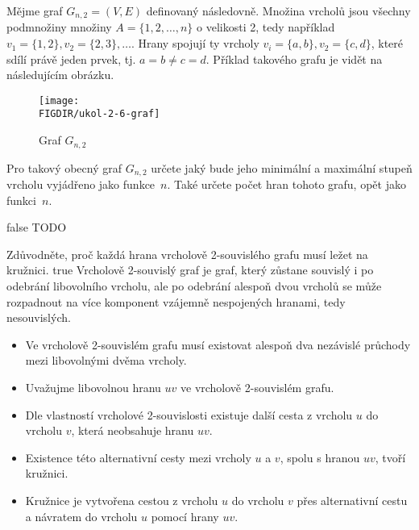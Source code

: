 \documentclass[10pt, a4paper]{ReportSheet}
\begin{document}
    \begin{uloha}{6}{2}{
        Mějme graf $G_{n,2} = (V, E)$ definovaný následovně. Množina vrcholů jsou všechny podmnožiny množiny $A = \{1, 2, \ldots, n\}$ o velikosti 2, tedy například $v_1 = \{1, 2\}, v_2 = \{2, 3\}, \ldots$. Hrany spojují ty vrcholy $v_i = \{a, b\}, v_2 = \{c, d\}$, které sdílí právě jeden prvek, tj. $a = b \ne c = d$. Příklad takového grafu je vidět na následujícím obrázku.

        \begin{figure}[H]
            \centering
            \texttt{[image: \\FIGDIR/ukol-2-6-graf]}
            \caption{Graf $G_{n,2}$}
            \label{fig:ukol-2-6-graf}
        \end{figure}

        Pro takový obecný graf $G_{n,2}$ určete jaký bude jeho minimální a maximální stupeň vrcholu vyjádřeno jako
        funkce~$n$.
        Také určete počet hran tohoto grafu, opět jako funkci~$n$.
    }{false}
        TODO
    \end{uloha}

    \begin{uloha}{7}{2}{
        Zdůvodněte, proč každá hrana vrcholově 2-souvislého grafu musí ležet na kružnici.
    }{true}
        Vrcholově 2-souvislý graf je graf, který zůstane souvislý i po odebrání libovolního vrcholu, ale po odebrání
        alespoň dvou vrcholů se může rozpadnout na více komponent vzájemně nespojených hranami, tedy nesouvislých.

        \begin{itemize}
            \item Ve vrcholově 2-souvislém grafu musí existovat alespoň dva nezávislé průchody mezi libovolnými dvěma vrcholy.
            \item Uvažujme libovolnou hranu $uv$ ve vrcholově 2-souvislém grafu.
            \item Dle vlastností vrcholové 2-souvislosti existuje další cesta z vrcholu $u$ do vrcholu $v$, která
            neobsahuje hranu $uv$.
            \item Existence této alternativní cesty mezi vrcholy $u$ a $v$, spolu s hranou $uv$, tvoří kružnici.
            \item Kružnice je vytvořena cestou z vrcholu $u$ do vrcholu $v$ přes alternativní cestu a návratem do
            vrcholu $u$ pomocí hrany $uv$.
        \end{itemize}


    \end{uloha}
\end{document}
